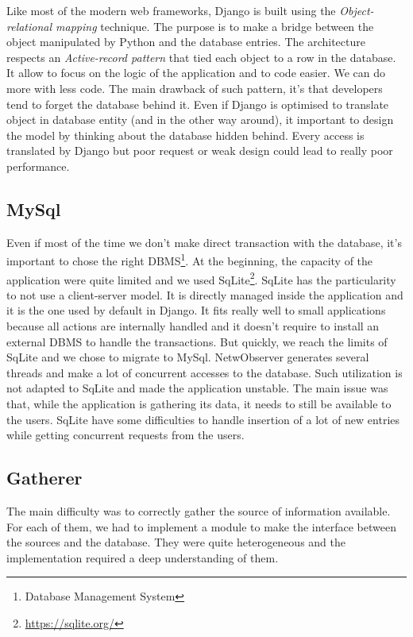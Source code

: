 Like most of the modern web frameworks, Django is built using the \emph{Object-relational mapping} technique. The purpose is to make a bridge between the object manipulated by Python and the database entries. The architecture respects an \emph{Active-record pattern} that tied each object to a row in the database. It allow to focus on the logic of the application and to code easier. We can do more with less code. The main drawback of such pattern, it's that developers tend to forget the database behind it. Even if Django is optimised to translate object in database entity (and in the other way around), it important to design the model by thinking about the database hidden behind. Every access is translated by Django but poor request or weak design could lead to really poor performance.

\subsection{MySql}
Even if most of the time we don't make direct transaction with the database, it's important to chose the right DBMS\footnote{Database Management System}. At the beginning, the capacity of the application were quite limited and we used SqLite\footnote{\url{https://sqlite.org/}}. SqLite has the particularity to not use a client-server model. It is directly managed inside the application and it is the one used by default in Django. It fits really well to small applications because all actions are internally handled and it doesn't require to install an external DBMS to handle the transactions. But quickly, we reach the limits of SqLite and we chose to migrate to MySql. NetwObserver generates several threads and make a lot of concurrent accesses to the database. Such utilization is not adapted to SqLite and made the application unstable. The main issue was that, while the application is gathering its data, it needs to still be available to the users. SqLite have some difficulties to handle insertion of a lot of new entries while getting concurrent requests from the users.

\subsection{Gatherer}
The main difficulty was to correctly gather the source of information available. For each of them, we had to implement a module to make the interface between the sources and the database. They were quite heterogeneous and the implementation required a deep understanding of them.
